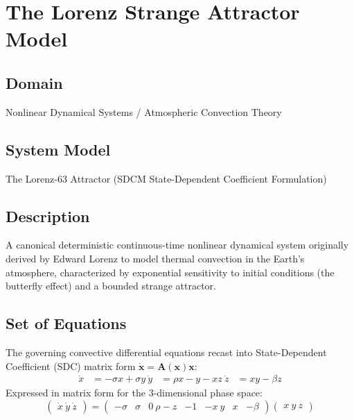 \chapter{The Lorenz Strange Attractor Model}

\section{Domain}
Nonlinear Dynamical Systems / Atmospheric Convection Theory

\section{System Model}
The Lorenz-63 Attractor (SDCM State-Dependent Coefficient Formulation)

\section{Description}
A canonical deterministic continuous-time nonlinear dynamical system originally derived by Edward Lorenz to model thermal convection in the Earth's atmosphere, characterized by exponential sensitivity to initial conditions (the butterfly effect) and a bounded strange attractor.

\section{Set of Equations}
The governing convective differential equations recast into State-Dependent Coefficient (SDC) matrix form $\dot{\mathbf{x}} = \mathbf{A}(\mathbf{x})\mathbf{x}$:
\begin{align}
	\dot{x} &= -\sigma x + \sigma y \
	\dot{y} &= \rho x - y - x z \
	\dot{z} &= x y - \beta z
\end{align}
Expressed in matrix form for the 3-dimensional phase space:
\begin{equation}
	\begin{pmatrix} \dot{x} \ \dot{y} \ \dot{z} \end{pmatrix} = \begin{pmatrix}
		-\sigma & \sigma & 0 \
		\rho - z & -1 & -x \
		y & x & -\beta
	\end{pmatrix} \begin{pmatrix} x \ y \ z \end{pmatrix}
\end{equation}

